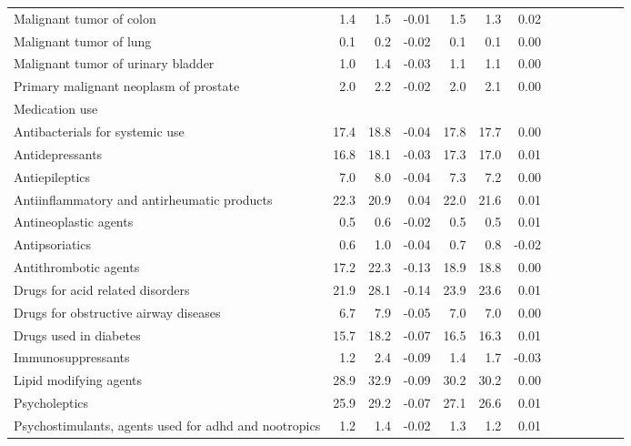 \documentclass[11pt,]{article}
\begin{document}
\begin{longtable}{lrrrrrrrrrrrr}
      Malignant tumor of colon &  1.4 &  1.5 & -0.01 &  1.5 &  1.3 &  0.02 \\ 
      Malignant tumor of lung &  0.1 &  0.2 & -0.02 &  0.1 &  0.1 &  0.00 \\ 
      Malignant tumor of urinary bladder &  1.0 &  1.4 & -0.03 &  1.1 &  1.1 &  0.00 \\ 
      Primary malignant neoplasm of prostate &  2.0 &  2.2 & -0.02 &  2.0 &  2.1 &  0.00 \\ 
  Medication use &    &    &     &    &    &     \\ 
      Antibacterials for systemic use & 17.4 & 18.8 & -0.04 & 17.8 & 17.7 &  0.00 \\ 
      Antidepressants & 16.8 & 18.1 & -0.03 & 17.3 & 17.0 &  0.01 \\ 
      Antiepileptics &  7.0 &  8.0 & -0.04 &  7.3 &  7.2 &  0.00 \\ 
      Antiinflammatory and antirheumatic products & 22.3 & 20.9 &  0.04 & 22.0 & 21.6 &  0.01 \\ 
      Antineoplastic agents &  0.5 &  0.6 & -0.02 &  0.5 &  0.5 &  0.01 \\ 
      Antipsoriatics &  0.6 &  1.0 & -0.04 &  0.7 &  0.8 & -0.02 \\ 
      Antithrombotic agents & 17.2 & 22.3 & -0.13 & 18.9 & 18.8 &  0.00 \\ 
      Drugs for acid related disorders & 21.9 & 28.1 & -0.14 & 23.9 & 23.6 &  0.01 \\ 
      Drugs for obstructive airway diseases &  6.7 &  7.9 & -0.05 &  7.0 &  7.0 &  0.00 \\ 
      Drugs used in diabetes & 15.7 & 18.2 & -0.07 & 16.5 & 16.3 &  0.01 \\ 
      Immunosuppressants &  1.2 &  2.4 & -0.09 &  1.4 &  1.7 & -0.03 \\ 
      Lipid modifying agents & 28.9 & 32.9 & -0.09 & 30.2 & 30.2 &  0.00 \\ 
      Psycholeptics & 25.9 & 29.2 & -0.07 & 27.1 & 26.6 &  0.01 \\ 
      Psychostimulants, agents used for adhd and nootropics &  1.2 &  1.4 & -0.02 &  1.3 &  1.2 &  0.01 \\ 
   \bottomrule\end{longtable}
\clearpage
{}
\end{document}
